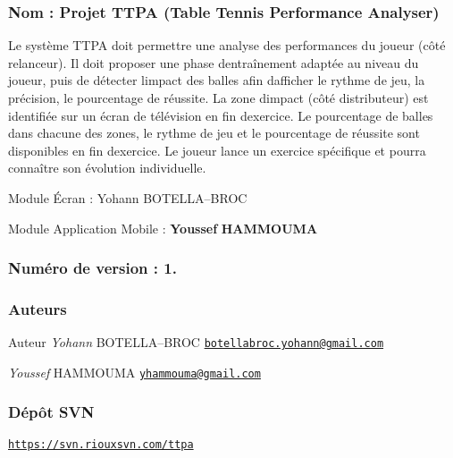 \subsubsection*{Nom \+: Projet T\+T\+PA (Table Tennis Performance Analyser)}

Le système T\+T\+PA doit permettre une analyse des performances du joueur (côté relanceur). Il doit proposer une phase d\textquotesingle{}entraînement adaptée au niveau du joueur, puis de détecter l\textquotesingle{}impact des balles afin d\textquotesingle{}afficher le rythme de jeu, la précision, le pourcentage de réussite. La zone d\textquotesingle{}impact (côté distributeur) est identifiée sur un écran de télévision en fin d\textquotesingle{}exercice. Le pourcentage de balles dans chacune des zones, le rythme de jeu et le pourcentage de réussite sont disponibles en fin d\textquotesingle{}exercice. Le joueur lance un exercice spécifique et pourra connaître son évolution individuelle.


\begin{DoxyItemize}
\item Module Écran \+: Yohann B\+O\+T\+E\+L\+LA--B\+R\+OC
\item Module Application Mobile \+: {\bfseries Youssef} {\bfseries H\+A\+M\+M\+O\+U\+MA} 
\end{DoxyItemize}

\subsubsection*{Numéro de version \+: 1.}

\subsubsection*{Auteurs}

\begin{DoxyAuthor}{Auteur}
{\itshape Yohann} B\+O\+T\+E\+L\+LA--B\+R\+OC \href{mailto:botellabroc.yohann@gmail.com}{\tt botellabroc.\+yohann@gmail.\+com}

{\itshape Youssef} H\+A\+M\+M\+O\+U\+MA \href{mailto:yhammouma@gmail.com}{\tt yhammouma@gmail.\+com}
\end{DoxyAuthor}
\subsubsection*{Dépôt S\+VN}

\href{https://svn.riouxsvn.com/ttpa}{\tt https\+://svn.\+riouxsvn.\+com/ttpa}

